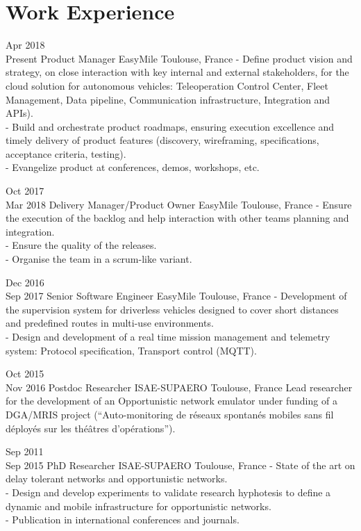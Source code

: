 \documentclass[10pt,a4paper,sans]{moderncv}
\begin{document}

\section{Work Experience}


\cventry
{Apr 2018\\Present}
{Product Manager}
{EasyMile}
{Toulouse, France}
{}
{
- Define product vision and strategy, on close interaction with key internal and external stakeholders, for the cloud solution for autonomous vehicles: Teleoperation Control Center, Fleet Management, Data pipeline, Communication infrastructure, Integration and APIs).\\
- Build and orchestrate product roadmaps, ensuring execution excellence and timely delivery of product features (discovery, wireframing, specifications, acceptance criteria, testing).\\
- Evangelize product at conferences, demos, workshops, etc.\\
}

\cventry
{Oct 2017\\Mar 2018}
{Delivery Manager/Product Owner}
{EasyMile}
{Toulouse, France}
{}
{
- Ensure the execution of the backlog and help interaction with other teams planning and integration.\\
- Ensure the quality of the releases.\\
- Organise the team in a scrum-like variant.\\
}

\cventry
{Dec 2016\\Sep 2017}
{Senior Software Engineer}
{EasyMile}
{Toulouse, France}
{}
{
- Development of the supervision system for driverless vehicles designed to cover short distances and predefined routes in multi-use environments.\\
- Design and development of a real time mission management and telemetry system: Protocol specification, Transport control (MQTT).
}


\cventry
{Oct 2015\\Nov 2016}
{Postdoc Researcher}
{ISAE-SUPAERO}
{Toulouse, France}
{}
{
Lead researcher for the development of an Opportunistic network emulator under funding of a DGA/MRIS project (``Auto-monitoring de réseaux spontanés mobiles sans fil déployés sur les théâtres d'opérations'').\\
}

\cventry
{Sep 2011\\Sep 2015}
{PhD Researcher}
{ISAE-SUPAERO}
{Toulouse, France}
{}
{
- State of the art on delay tolerant networks and opportunistic networks.\\
- Design and develop experiments to validate research hyphotesis to define a dynamic and mobile infrastructure for opportunistic networks.\\
- Publication in international conferences and journals.\\
}
\end{document}
